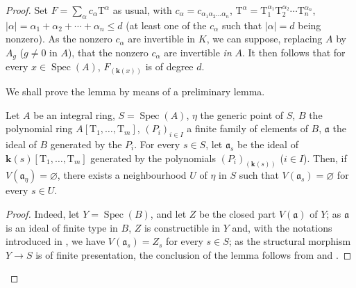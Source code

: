 \begin{proof}
Set $F=\sum_\alpha c_\alpha \mathrm{T}^\alpha$ as usual, with $c_\alpha=c_{\alpha_1\alpha_2\ldots\alpha_n}$, $\mathrm{T}^\alpha=\mathrm{T}_1^{\alpha_1}\mathrm{T}_2^{\alpha_2}\cdots\mathrm{T}_n^{\alpha_n}$, $|\alpha|=\alpha_1+\alpha_2+\cdots+\alpha_n\leqslant d$ (at least one of the $c_\alpha$ such that $|\alpha|=d$ being nonzero).
As the nonzero $c_\alpha$ are invertible in $K$, we can suppose, replacing $A$ by $A_g$ ($g\neq 0$ in $A$), that the nonzero $c_\alpha$ are invertible \emph{in} $A$.
It then follows that for every $x\in\operatorname{Spec}(A)$, $F_{(\boldsymbol{k}(x))}$ is of degree $d$.

We shall prove the lemma by means of a preliminary lemma.

\begin{lemma}[9.7.5.1]
\label{IV.9.7.5.1}
Let $A$ be an integral ring, $S=\operatorname{Spec}(A)$, $\eta$ the generic point of $S$, $B$ the polynomial ring $A[\mathrm{T}_1,\ldots,\mathrm{T}_m]$, $(P_i)_{i\in I}$ a finite family of elements of $B$, $\mathfrak{a}$ the ideal of $B$ generated by the $P_i$.
For every $s\in S$, let $\mathfrak{a}_s$ be the ideal of $\boldsymbol{k}(s)[\mathrm{T}_1,\ldots,\mathrm{T}_m]$ generated by the polynomials $(P_i)_{(\boldsymbol{k}(s))}$ ($i\in I$).
Then, if $V(\mathfrak{a}_\eta)=\varnothing$, there exists a neighbourhood $U$ of $\eta$ in $S$ such that $V(\mathfrak{a}_s)=\varnothing$ for every $s\in U$.
\end{lemma}

\begin{proof}
Indeed, let $Y=\operatorname{Spec}(B)$, and let $Z$ be the closed part $V(\mathfrak{a})$ of $Y$; as $\mathfrak{a}$ is an ideal of finite type in $B$, $Z$ is constructible in $Y$  and, with the notations introduced in , we have $V(\mathfrak{a}_s)=Z_s$ for every $s\in S$; as the structural morphism $Y\to S$ is of finite presentation, the conclusion of the lemma follows from  and .
\end{proof}


\end{proof}
